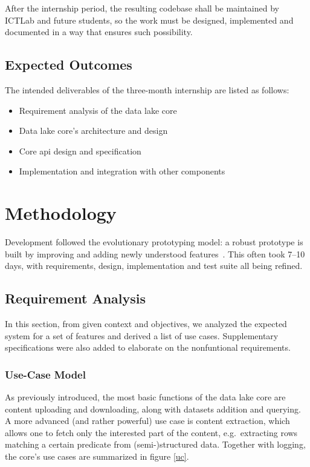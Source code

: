 \documentclass[a4paper,oneside,12pt]{book}
\begin{document}
After the internship period, the resulting codebase shall be maintained
by ICTLab and future students, so the work must be designed, implemented
and documented in a way that ensures such possibility.

\section{Expected Outcomes}
The intended deliverables of the three-month internship are listed as follows:
\begin{itemize}
  \item Requirement analysis of the data lake core
  \item Data lake core's architecture and design
  \item Core \gls{api} design and specification
  \item Implementation and integration with other components
\end{itemize}

\chapter{Methodology}
Development followed the evolutionary prototyping model: a robust prototype
is built by improving and adding newly understood features~\cite{proto}.
This often took 7--10 days, with requirements, design, implementation
and test suite all being refined.

\section{Requirement Analysis}
In this section, from given context and objectives, we analyzed
the expected system for a set of features and derived a list of use cases.
Supplementary specifications were also added to elaborate
on the nonfuntional requirements.

\subsection{Use-Case Model}
As previously introduced, the most basic functions of the data lake core
are content uploading and downloading, along with datasets addition
and querying.  A more advanced (and rather powerful) use case is
content extraction, which allows one to fetch only the interested part
of the content, e.g.~extracting rows matching a certain \gls{predicate}
from (semi-)structured data.  Together with logging, the core's use cases
are summarized in figure \ref{uc}.
\end{document}
